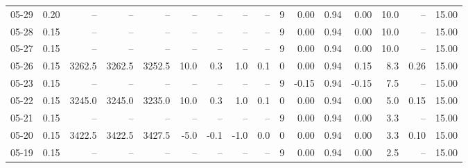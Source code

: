 \begin{threeparttable}
{\begin{tabular}{lrrrrrrrrrrrrrrr}
  05-29 &     0.20 &     -- &     -- &     -- &         -- &             -- &                       -- &                  -- &              9 &       0.00 &      0.94 &           0.00 &             10.0 &              -- &                  15.00 \\
  05-28 &     0.15 &     -- &     -- &     -- &         -- &             -- &                       -- &                  -- &              9 &       0.00 &      0.94 &           0.00 &             10.0 &              -- &                  15.00 \\
  05-27 &     0.15 &     -- &     -- &     -- &         -- &             -- &                       -- &                  -- &              9 &       0.00 &      0.94 &           0.00 &             10.0 &              -- &                  15.00 \\
  05-26 &     0.15 & 3262.5 & 3262.5 & 3252.5 &       10.0 &            0.3 &                      1.0 &                 0.1 &              0 &       0.00 &      0.94 &           0.15 &              8.3 &            0.26 &                  15.00 \\
  05-23 &     0.15 &     -- &     -- &     -- &         -- &             -- &                       -- &                  -- &              9 &      -0.15 &      0.94 &          -0.15 &              7.5 &              -- &                  15.00 \\
  05-22 &     0.15 & 3245.0 & 3245.0 & 3235.0 &       10.0 &            0.3 &                      1.0 &                 0.1 &              0 &       0.00 &      0.94 &           0.00 &              5.0 &            0.15 &                  15.00 \\
  05-21 &     0.15 &     -- &     -- &     -- &         -- &             -- &                       -- &                  -- &              9 &       0.00 &      0.94 &           0.00 &              3.3 &              -- &                  15.00 \\
  05-20 &     0.15 & 3422.5 & 3422.5 & 3427.5 &       -5.0 &           -0.1 &                     -1.0 &                 0.0 &              0 &       0.00 &      0.94 &           0.00 &              3.3 &            0.10 &                  15.00 \\
  05-19 &     0.15 &     -- &     -- &     -- &         -- &             -- &                       -- &                  -- &              9 &       0.00 &      0.94 &           0.00 &              2.5 &              -- &                  15.00 \\

\end{tabular}}
\end{threeparttable}
